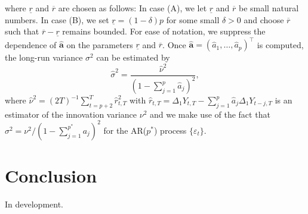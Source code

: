 \documentclass[a4paper]{scrartcl}
\begin{document}
where $\underline{r}$ and $\overline{r}$ are chosen as follows: In case (A), we let $\underline{r}$ and $\overline{r}$ be small natural numbers. In case (B), we set $\underline{r} = (1-\delta) p$ for some small $\delta > 0$ and choose $\overline{r}$ such that $\overline{r} - \underline{r}$ remains bounded. For ease of notation, we suppress the dependence of $\widehat{\boldsymbol{a}}$ on the parameters $\underline{r}$ and $\overline{r}$. Once $\widehat{\boldsymbol{a}} =(\widehat{a}_1,\ldots,\widehat{a}_p)^\top$ is computed, the long-run variance $\sigma^2$ can be estimated by 
\begin{equation} \label{est-lrv}
\widehat{\sigma}^2 = \frac{\widehat{\nu}^2}{(1 - \sum_{j=1}^p \widehat{a}_j)^2}, 
\end{equation}
where $\widehat{\nu}^2 = (2T)^{-1} \sum_{t=p+2}^T \widehat{r}_{t,T}^2$ with $\widehat{r}_{t,T} = \Delta_1 Y_{t,T} - \sum_{j=1}^p \widehat{a}_j \Delta_1 Y_{t-j,T}$ is an estimator of the innovation variance $\nu^2$ and we make use of the fact that $\sigma^2 = \nu^2 / (1 - \sum_{j=1}^{p^*} a_j)^2$ for the AR($p^*$) process $\{\varepsilon_t\}$. 



\section{Conclusion}\label{sec:concl}
In development.



\end{document}
